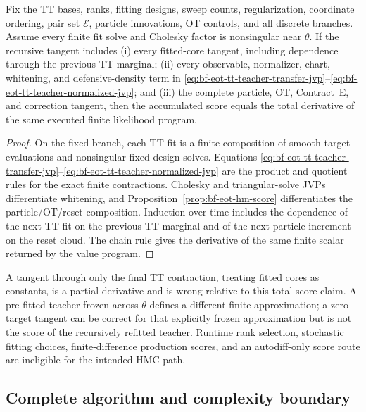\begin{proposition}
\label{prop:bf-eot-tt-teacher-total-score}
Fix the TT bases, ranks, fitting designs, sweep counts, regularization,
coordinate ordering, pair set \(\mathcal E\), particle innovations, OT
controls, and all discrete branches.  Assume every finite fit solve and
Cholesky factor is nonsingular near \(\theta\).  If the recursive tangent
includes (i) every fitted-core tangent, including dependence through the
previous TT marginal; (ii) every observable, normalizer, chart, whitening, and
defensive-density term in
\eqref{eq:bf-eot-tt-teacher-transfer-jvp}--\eqref{eq:bf-eot-tt-teacher-normalized-jvp};
and (iii) the complete particle, OT, Contract~E, and correction tangent, then
the accumulated score equals the total derivative of the same executed finite
likelihood program.
\end{proposition}

\begin{proof}
On the fixed branch, each TT fit is a finite composition of smooth target
evaluations and nonsingular fixed-design solves.  Equations
\eqref{eq:bf-eot-tt-teacher-transfer-jvp}--\eqref{eq:bf-eot-tt-teacher-normalized-jvp}
are the product and quotient rules for the exact finite contractions.
Cholesky and triangular-solve JVPs differentiate whitening, and
Proposition~\ref{prop:bf-eot-hm-score} differentiates the particle/OT/reset
composition.  Induction over time includes the dependence of the next TT fit
on the previous TT marginal and of the next particle increment on the reset
cloud.  The chain rule gives the derivative of the same finite scalar returned
by the value program.
\end{proof}

A tangent through only the final TT contraction, treating fitted cores as
constants, is a partial derivative and is wrong relative to this total-score
claim.  A pre-fitted teacher frozen across \(\theta\) defines a different
finite approximation; a zero target tangent can be correct for that explicitly
frozen approximation but is not the score of the recursively refitted teacher.
Runtime rank selection, stochastic fitting choices, finite-difference
production scores, and an autodiff-only score route are ineligible for the
intended HMC path.

\subsection{Complete algorithm and complexity boundary}

